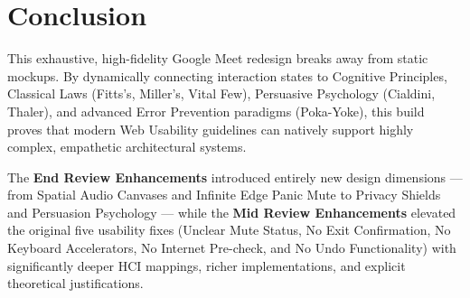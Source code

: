 \documentclass[12pt,a4paper]{article}
\begin{document}
\section{Conclusion}
This exhaustive, high-fidelity Google Meet redesign breaks away from static mockups. By dynamically connecting interaction states to Cognitive Principles, Classical Laws (Fitts's, Miller's, Vital Few), Persuasive Psychology (Cialdini, Thaler), and advanced Error Prevention paradigms (Poka-Yoke), this build proves that modern Web Usability guidelines can natively support highly complex, empathetic architectural systems.

The \textbf{End Review Enhancements} introduced entirely new design dimensions — from Spatial Audio Canvases and Infinite Edge Panic Mute to Privacy Shields and Persuasion Psychology — while the \textbf{Mid Review Enhancements} elevated the original five usability fixes (Unclear Mute Status, No Exit Confirmation, No Keyboard Accelerators, No Internet Pre-check, and No Undo Functionality) with significantly deeper HCI mappings, richer implementations, and explicit theoretical justifications.

\vspace{1cm}
\end{document}
